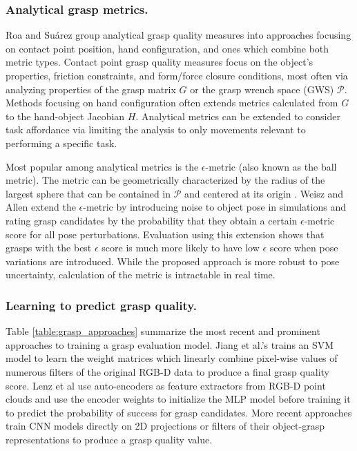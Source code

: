 \documentclass[runningheads]{../llncs}
\begin{document}
\subsubsection*{Analytical grasp metrics.}

Roa and Su{\'a}rez \cite{Roa2015} group analytical grasp quality measures into approaches focusing on contact point
position, hand configuration, and ones which combine both metric types. Contact point grasp quality measures focus on
the object's properties, friction constraints, and form/force closure conditions, most often via analyzing properties
of the grasp matrix $ G $ or the grasp wrench space (GWS) $ \mathcal{P} $. Methods focusing on hand configuration often
extends metrics calculated from $ G $ to the hand-object Jacobian $ H $. Analytical metrics can be extended to consider
task affordance via limiting the analysis to only movements relevant to performing a specific task.

Most popular among analytical metrics is the $ \epsilon $-metric (also known as the ball metric). The metric can be
geometrically characterized by the radius of the largest sphere that can be contained in $ \mathcal{P} $ and centered
at its origin \cite{Roa2015}. Weisz and Allen \cite{WeiszAllen2012} extend the $\epsilon$-metric by introducing noise
to object pose in simulations and rating grasp candidates by the probability that they obtain a certain
$ \epsilon $-metric score for all pose perturbations. Evaluation using this extension shows that grasps with the best
$ \epsilon $ score is much more likely to have low $ \epsilon $ score when pose variations are introduced. While the
proposed approach is more robust to pose uncertainty, calculation of the metric is intractable in real time.

\subsubsection*{Learning to predict grasp quality.}

Table \ref{table:grasp_approaches} summarize the most recent and prominent approaches to training a grasp evaluation
model. Jiang et al.'s \cite{jiang2011} trains an SVM model to learn the weight matrices which linearly combine
pixel-wise values of numerous filters of the original RGB-D data to produce a final grasp quality score. Lenz et al
\cite{lenz2015} use auto-encoders as feature extractors from RGB-D point clouds and use the encoder weights to
initialize the MLP model before training it to predict the probability of success for grasp candidates. More recent
approaches \cite{Kappler2015,Gualtieri2016,mahler2017} train CNN models directly on 2D projections or filters of their
object-grasp representations to produce a grasp quality value.
\end{document}
